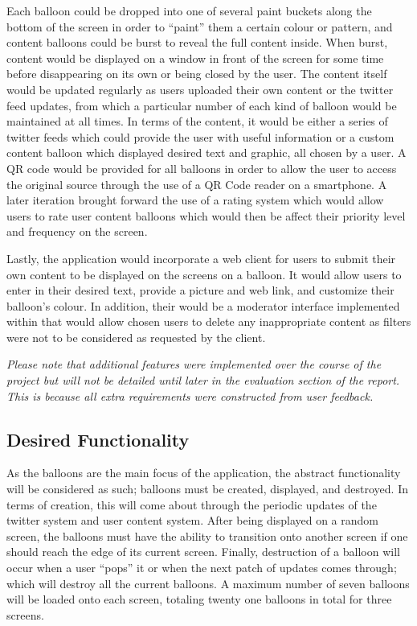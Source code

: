 \documentclass[a4paper,11pt]{article}
\begin{document}
\begin{description}
Each balloon could be dropped into one of several paint buckets along the bottom of the screen in order to ``paint'' them a certain colour or pattern, and content balloons could be burst to reveal the full content inside. When burst, content would be displayed on a window in front of the screen for some time before disappearing on its own or being closed by the user. The content itself would be updated regularly as users uploaded their own content or the twitter feed updates, from which a particular number of each kind of balloon would be maintained at all times. In terms of the content, it would be either a series of twitter feeds which could provide the user with useful information or a custom content balloon which displayed desired text and graphic, all chosen by a user. A QR code would be provided for all balloons in order to allow the user to access the original source through the use of a QR Code reader on a smartphone. A later iteration brought forward the use of a rating system which would allow users to rate user content balloons which would then be affect their priority level and frequency on the screen.

Lastly, the application would incorporate a web client for users to submit their own content to be displayed on the screens on a balloon. It would allow users to enter in their desired text, provide a picture and web link, and customize their balloon's colour. In addition, their would be a moderator interface implemented within that would allow chosen users to delete any inappropriate content as filters were not to be considered as requested by the client.

\begin{center}
\textit{Please note that additional features were implemented over the course of the project but will not be detailed until later in the evaluation section of the report. This is because all extra requirements were constructed from user feedback.}
\end{center}

\subsection{Desired Functionality}
As the balloons are the main focus of the application, the abstract functionality will be considered as such; balloons must be created, displayed, and destroyed. In terms of creation, this will come about through the periodic updates of the twitter system and user content system. After being displayed on a random screen, the balloons must have the ability to transition onto another screen if one should reach the edge of its current screen. Finally, destruction of a balloon will occur when a user ``pops'' it or when the next patch of updates comes through; which will destroy all the current balloons. A maximum number of seven balloons will be loaded onto each screen, totaling twenty one balloons in total for three screens.


\end{description}
\end{document}
